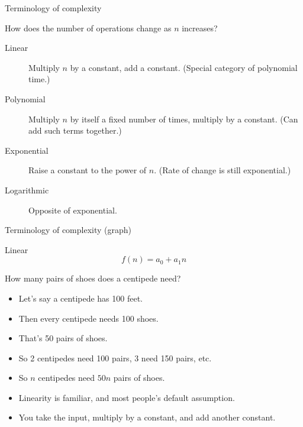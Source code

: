\begin{frame}{Terminology of complexity}
  \begin{alertblock}{How does the number of operations change as $n$ increases?}
    \begin{description}
      \item[Linear] Multiply $n$ by a constant, add a constant. (Special category of polynomial time.)
      \item[Polynomial] Multiply $n$ by itself a fixed number of times, multiply by a constant. (Can add such terms together.)
      \item[Exponential] Raise a constant to the power of $n$. (Rate of change is still exponential.)
      \item[Logarithmic] Opposite of exponential.
    \end{description}
  \end{alertblock}
\end{frame}


\begin{frame}[fragile]{Terminology of complexity (graph)}
\begin{center}
\end{center}
\end{frame}


\begin{frame}{Linear}
  \[ f(n) = a_0 + a_1 n \]
  \begin{alertblock}{How many pairs of shoes does a centipede need?}
    \begin{itemize}
      \item Let's say a centipede has 100 feet.
      \item Then every centipede needs 100 shoes.
      \item That's 50 pairs of shoes.
      \item So 2 centipedes need 100 pairs, 3 need 150 pairs, etc.
      \item So $n$ centipedes need $50n$ pairs of shoes.
      \item Linearity is familiar, and most people's default assumption.
      \item You take the input, multiply by a constant, and add another constant.
    \end{itemize}
  \end{alertblock}
\end{frame}


